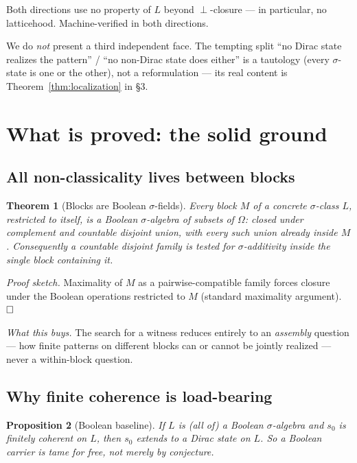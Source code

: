 \documentclass[11pt]{article}
\newtheorem{theorem}{Theorem}[section]
\newtheorem{proposition}[theorem]{Proposition}
\theoremstyle{remark}
\begin{document}
Both directions use no property of $L$ beyond $\perp$-closure — in
particular, no latticehood. Machine-verified in both directions.

We do \emph{not} present a third independent face. The tempting split ``no
Dirac state realizes the pattern'' / ``no non-Dirac state does either'' is a
tautology (every $\sigma$-state is one or the other), not a reformulation —
its real content is Theorem~\ref{thm:localization} in \S3.

\section{What is proved: the solid ground}

\subsection{All non-classicality lives between blocks}

\begin{theorem}[Blocks are Boolean $\sigma$-fields]
\label{thm:blocks-boolean}
Every block $M$ of a concrete $\sigma$-class $L$, restricted to itself, is a
Boolean $\sigma$-algebra of subsets of $\Omega$: closed under complement and
countable disjoint union, with every such union already inside $M$.
Consequently a countable disjoint family is tested for $\sigma$-additivity
inside the single block containing it.
\end{theorem}

\emph{Proof sketch.} Maximality of $M$ as a pairwise-compatible family forces
closure under the Boolean operations restricted to $M$ (standard
maximality argument). $\hfill\square$

\emph{What this buys.} The search for a witness reduces entirely to an
\emph{assembly} question — how finite patterns on different blocks can or
cannot be jointly realized — never a within-block question.

\subsection{Why finite coherence is load-bearing}

\begin{proposition}[Boolean baseline]
\label{prop:coherence-required}
If $L$ is (all of) a Boolean $\sigma$-algebra and $s_0$ is finitely coherent
on $L$, then $s_0$ extends to a Dirac state on $L$. So a Boolean carrier is
tame for free, not merely by conjecture.
\end{proposition}
\end{document}
